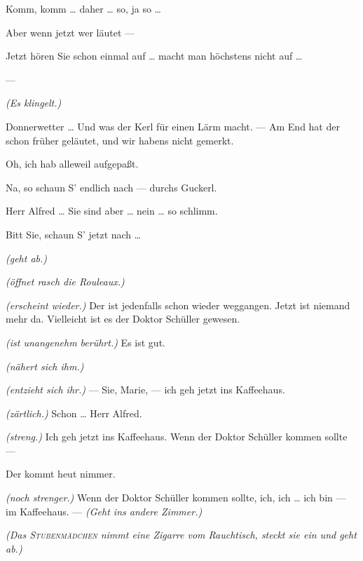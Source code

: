 \documentclass[
	final,
	a4paper,
	ngerman,
	mpinclude = true, %
	twoside = true,
	open = right,
	cleardoublepage = plain,
	DIV = 13,
	BCOR = 1cm,
	titlepage = firstiscover,
	]{scrbook}
\newcommand{\direction}[1]{\textit{(#1)}}
\newcommand{\hiat}{---}
\newcommand{\thecharacter}[1]{\textup{\textsc{#1}}}
\newcommand{\themaedchen}{\thecharacter{Stubenmädchen}}
\newcommand{\theherr}{\thecharacter{Junger Herr}}
\newcommand{\character}[1]{\item[#1:]}
\newcommand{\maedchen}{\character{\themaedchen}}
\newcommand{\herr}{\character{\theherr}}
\begin{document}
\begin{play}
	\herr
	Komm, komm \ldots{} daher \ldots{} so, ja so \ldots{}

	\maedchen
	Aber wenn jetzt wer läutet ---

	\herr
	Jetzt hören Sie schon einmal auf \ldots{} macht man höchstens nicht auf \ldots{}

	\hiat

	\direction{Es klingelt.}

	\herr
	Donnerwetter \ldots{} Und was der Kerl für einen Lärm macht. --- Am End hat der schon früher geläutet, und wir habens nicht gemerkt.

	\maedchen
	Oh, ich hab alleweil aufgepaßt.

	\herr
	Na, so schaun S' endlich nach --- durchs Guckerl.

	\maedchen
	Herr Alfred \ldots{} Sie sind aber \ldots{} nein \ldots{} so schlimm.

	\herr
	Bitt Sie, schaun S' jetzt nach \ldots{}

	\maedchen
	\direction{geht ab.}

	\herr
	\direction{öffnet rasch die Rouleaux.}

	\maedchen
	\direction{erscheint wieder.} Der ist jedenfalls schon wieder weggangen. Jetzt ist niemand mehr da. Vielleicht ist es der Doktor Schüller gewesen.

	\herr
	\direction{ist unangenehm berührt.} Es ist gut.

	\maedchen
	\direction{nähert sich ihm.}

	\herr
	\direction{entzieht sich ihr.} --- Sie, Marie, --- ich geh jetzt ins Kaffeehaus.

	\maedchen
	\direction{zärtlich.} Schon \ldots{} Herr Alfred.

	\herr
	\direction{streng.} Ich geh jetzt ins Kaffeehaus. Wenn der Doktor Schüller kommen sollte ---

	\maedchen
	Der kommt heut nimmer.

	\herr
	\direction{noch strenger.} Wenn der Doktor Schüller kommen sollte, ich, ich \ldots{} ich bin --- im Kaffeehaus. --- \direction{Geht ins andere Zimmer.}

	\direction{Das \themaedchen{} nimmt eine Zigarre vom Rauchtisch, steckt sie ein und geht ab.}

\end{play}
\end{document}
